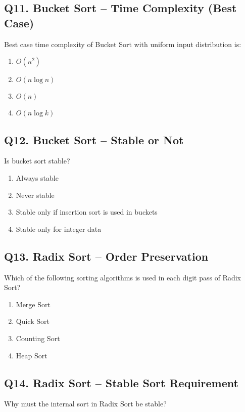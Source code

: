 \subsection*{Q11. Bucket Sort – Time Complexity (Best Case)}
Best case time complexity of Bucket Sort with uniform input distribution is:

\begin{enumerate}[label=(\alph*)]
    \item \(O(n^2)\) \quad
    \item \(O(n \log n)\) \quad
    \item \(O(n)\) \quad
    \item \(O(n \log k)\)
\end{enumerate}


\subsection*{Q12. Bucket Sort – Stable or Not}
Is bucket sort stable?

\begin{enumerate}[label=(\alph*)]
    \item Always stable
    \item Never stable
    \item Stable only if insertion sort is used in buckets
    \item Stable only for integer data
\end{enumerate}


\subsection*{Q13. Radix Sort – Order Preservation}
Which of the following sorting algorithms is used in each digit pass of Radix Sort?

\begin{enumerate}[label=(\alph*)]
    \item Merge Sort \quad
    \item Quick Sort \quad
    \item Counting Sort \quad
    \item Heap Sort
\end{enumerate}


\subsection*{Q14. Radix Sort – Stable Sort Requirement}
Why must the internal sort in Radix Sort be stable?

